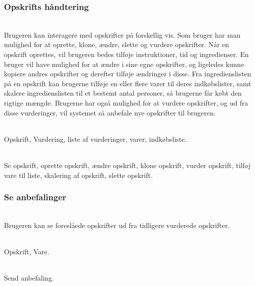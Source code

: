\subsubsection{Opskrifts håndtering}
\vspace{-6pt}
\begin{description}[font=\normalfont\itshape]
\item[Brugsmønster]\hfill\\
Brugeren kan interagere med opskrifter på forskellig vis. 
Som bruger har man mulighed for at oprette, klone, ændre, slette og vurdere opskrifter.
Når en opskrift oprettes, vil brugeren bedes tilføje instruktioner, tid og ingredienser.
En bruger vil have mulighed for at ændre i sine egne opskrifter, og ligeledes kunne kopiere andres opskrifter og derefter tilføje ændringer i disse.
Fra ingredienslisten på en opskrift kan brugerne tilføje en eller flere varer til deres indkøbslister, samt skalere ingredienslisten til et bestemt antal personer, så brugerne får købt den rigtige mængde.
Brugerne har også mulighed for at vurdere opskrifter, og ud fra disse vurderinger, vil systemet så anbefale nye opskrifter til brugeren.
\item[Objekter]\hfill\\
Opskrift, Vurdering, liste af vurderinger, varer, indkøbsliste.
\item[Funktioner]\hfill\\
Se opskrift, oprette opskrift, ændre opskrift, klone opskrift, vurder opskrift, tilføj vare til liste, skalering af opskrift, slette opskrift.
\end{description}

\subsubsection{Se anbefalinger}
\vspace{-6pt}
\begin{description}[font=\normalfont\itshape]
\item[Brugsmønster]\hfill\\
Brugeren kan se foreslåede opskrifter ud fra tidligere vurderede opskrifter.
\item[Objekter]\hfill\\
Opskrift, Vare.
\item[Funktioner]\hfill\\
Send anbefaling.
\end{description}

